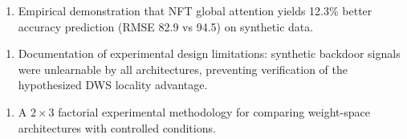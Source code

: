 \begin{enumerate}
\item Empirical demonstration that NFT global attention yields 12.3\% better accuracy prediction (RMSE 82.9 vs 94.5) on synthetic data.
\end{enumerate}

\begin{enumerate}
\item Documentation of experimental design limitations: synthetic backdoor signals were unlearnable by all architectures, preventing verification of the hypothesized DWS locality advantage.
\end{enumerate}

\begin{enumerate}
\item A $2\times 3$ factorial experimental methodology for comparing weight-space architectures with controlled conditions.
\end{enumerate}
